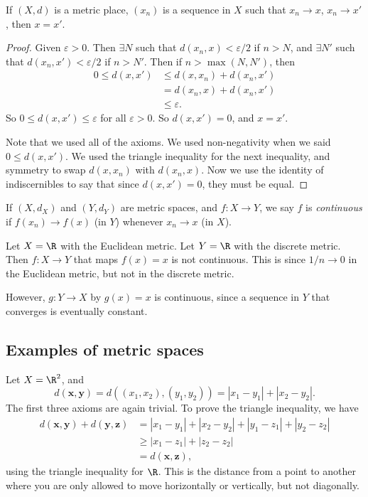 \documentclass[a4paper]{article}
\begin{document}
\begin{prop}
  If $(X, d)$ is a metric place, $(x_n)$ is a sequence in $X$ such that $x_n \to x$, $x_n \to x'$, then $x = x'$.
\end{prop}

\begin{proof}
  Given $\varepsilon > 0$. Then $\exists N$ such that $d(x_n, x) < \varepsilon/2$ if $n > N$, and $\exists N'$ such that $d(x_n, x') < \varepsilon/2$ if $n > N'$. Then if $n > \max(N, N')$, then 
  \begin{align*}
    0 \leq d(x, x') &\leq d(x, x_n) + d(x_n, x')\\
    &= d(x_n, x) + d(x_n, x')\\
    &\leq \varepsilon.
  \end{align*}
  So $0 \leq d(x, x') \leq \varepsilon$ for all $\varepsilon > 0$. So $d(x, x') = 0$, and $x = x'$.

  Note that we used all of the axioms. We used non-negativity when we said $0\leq d(x, x')$. We used the triangle inequality for the next inequality, and symmetry to swap $d(x, x_n)$ with $d(x_n, x)$. Now we use the identity of indiscernibles to say that since $d(x, x') = 0$, they must be equal.
\end{proof}

\begin{defi}[Continuity]
  If $(X, d_X)$ and $(Y, d_Y)$ are metric spaces, and $f:X \to Y$, we say $f$ is \emph{continuous} if $f(x_n) \to f(x)$ (in $Y$) whenever $x_n \to x$ (in $X$).
\end{defi}

\begin{eg}
  Let $X = \R$ with the Euclidean metric. Let $Y = \R$ with the discrete metric. Then
  $f:X \to Y$ that maps $f(x) = x$ is not continuous. This is since $1/n \to 0$ in the Euclidean metric, but not in the discrete metric.
  
  However, $g: Y\to X$ by $g(x) = x$ is continuous, since a sequence in $Y$ that converges is eventually constant.
\end{eg}

\subsection{Examples of metric spaces}
\begin{eg}
  Let $X = \R^2$, and
  \[
    d(\mathbf{x}, \mathbf{y}) = d((x_1, x_2), (y_1, y_2))  = |x_1 - y_1| + |x_2 - y_2|.
  \]
  The first three axioms are again trivial. To prove the triangle inequality, we have
  \begin{align*}
    d(\mathbf{x}, \mathbf{y}) + d(\mathbf{y}, \mathbf{z}) &= |x_1 - y_1| + |x_2 - y_2| + |y_1 - z_1| + |y_2 - z_2|\\
    &\geq |x_1 - z_1| + |z_2 - z_2|\\
    &= d(\mathbf{x}, \mathbf{z}),
  \end{align*}
  using the triangle inequality for $\R$. This is the distance from a point to another where you are only allowed to move horizontally or vertically, but not diagonally.
\end{eg}
\end{document}
